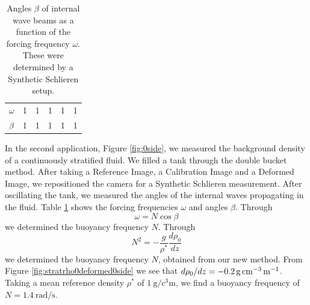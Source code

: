 \documentclass{svjour3}                     %
\begin{document}
\begin{table}[htbp]
\caption{Angles $\beta$ of internal wave beams as a function of the forcing frequency $\omega$. These were determined by a Synthetic Schlieren setup.}
\label{tab:SSintwav}
\centering
\begin{tabular}{llllll}
$\omega$ & 1 & 1 & 1 & 1 & 1  \\
$\beta$  & 1 & 1 & 1 & 1 & 1
\end{tabular}
\end{table}

In the second application, Figure \ref{fig:0side}, we measured the background density of a continuously stratified fluid. We filled a tank through the double bucket method. After taking a Reference Image, a Calibration Image and a Deformed Image, we repositioned the camera for a Synthetic Schlieren measurement. After oscillating the tank, we measured the angles of the internal waves propagating in the fluid. Table \ref{tab:SSintwav} shows the forcing frequencies $\omega$ and angles $\beta$. Through
\begin{equation}
	\omega = N \cos \beta
\end{equation}
we determined the buoyancy frequency $N$. Through
\begin{equation}
	N^2 = - \frac{g}{\rho^*}\frac{d \rho_0}{d z}
\end{equation}
we determined the buoyancy frequency $N$, obtained from our new method. From Figure \ref{fig:stratrho0deformed0side} we see that $d \rho_0 / d z =\SI{ - 0.2}{\gram\per\cubic\centi\metre\per\metre}$. Taking a mean reference density $\rho^*$ of $\SI{1}{\gram\per\cubic\centi\metre}$, we find a buoyancy frequency of $N = \SI{1.4}{\radian\per\second}$.
\end{document}
